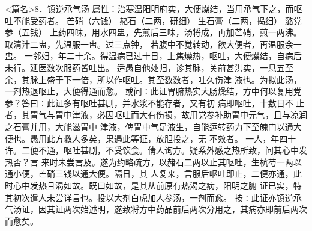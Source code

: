 \documentclass[a4paper,12pt,UTF8,twoside]{ctexbook}
\begin{document}
<篇名>8．镇逆承气汤
属性：治寒温阳明府实，大便燥结，当用承气下之，而呕吐不能受药者。 
芒硝（六钱） 赭石（二两，研细） 生石膏（二两，捣细） 潞党参（五钱） 
上药四味，用水四盅，先煎后三味，汤将成，再加芒硝，煎一两沸。取清汁二盅，先温服一盅。过三点钟， 
若腹中不觉转动，欲大便者，再温服余一盅。 
一邻妇，年二十余。得温病已过十日，上焦燥热，呕吐，大便燥结，自病后未行。延医数次服药皆吐出。 
适愚自他处归，诊其脉，关前甚洪实，一息五至余，其脉上盛于下一倍，所以作呕吐。其至数数者，吐久伤津 
液也。为拟此汤，一剂热退呕止，大便得通而愈。 
或问∶此证胃腑热实大肠燥结，方中何以复用党参？答曰∶此证多有呕吐甚剧，并水浆不能存者，又有初 
病即呕吐，十数日不 
止者，其胃气与胃中津液，必因呕吐而大有伤损，故用党参补助胃中元气，且与凉润之石膏并用，大能滋胃中 
津液，俾胃中气足液生，自能运转药力下至魄门以通大便也。愚用此方救人多矣，果遇此等证，放胆投之，无 
不效者。 
一人，年四十许。二便不通，呕吐甚剧，不受饮食。倩人询方。疑系外感之热所致，问其心中发热否？言 
来时未尝言及。遂为约略疏方，以赭石二两以止其呕吐，生杭芍一两以通小便，芒硝三钱以通大便。隔日，其 
人复来，言服后呕吐即止，二便亦通，此时心中发热且渴如故。既曰如故，是其从前原有热渴之病，阳明之腑 
证已实，特其初次遣人未尝详言也。投以大剂白虎加人参汤，一剂而愈。 
按∶此证亦镇逆承气汤证，因其证两次始述明，遂致将方中药品前后两次分用之，其病亦即前后两次而愈矣。 
\end{document}
